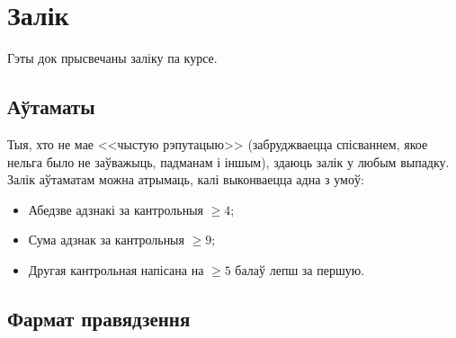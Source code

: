 \documentclass[12pt, a4paper]{extarticle}
\renewcommand{\ge}{\geqslant}
\begin{document}
    \section{Залік}
    Гэты док прысвечаны заліку па курсе.
    
    \subsection{Аўтаматы}
    Тыя, хто не мае <<чыстую рэпутацыю>> (забруджваецца спісваннем, якое нельга было не заўважыць, падманам і іншым), здаюць залік у любым выпадку.
    Залік аўтаматам можна атрымаць, калі выконваецца адна з умоў:
    \begin{itemize}
        \item Абедзве адзнакі за кантрольныя $\ge 4$;
        \item Сума адзнак за кантрольныя $\ge 9$;
        \item Другая кантрольная напісана на $\ge 5$ балаў лепш за першую.
    \end{itemize}

    \subsection{Фармат правядзення}
    
\end{document}
